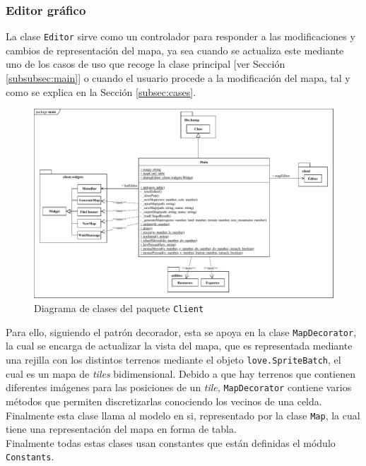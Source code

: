 \subsubsection{Editor gráfico}
\label{subsubsec:client}

La clase \texttt{Editor} sirve como un controlador para responder a las modificaciones y cambios de representación del mapa, ya sea cuando se actualiza este mediante uno de los casos de uso que recoge la clase principal [ver Sección \ref{subsubsec:main}] o cuando el usuario procede a la modificación del mapa, tal y como se explica en la Sección \ref{subsec:cases}.

\begin{figure}[!h]
	\centering
	\includegraphics[width=\textwidth]{images/clase-editor.pdf}
	\caption{Diagrama de clases del paquete \texttt{Client}}
	\label{fig:editorclass}
\end{figure}

Para ello, siguiendo el patrón decorador, esta se apoya en la clase \texttt{MapDecorator}, la cual se encarga de actualizar la vista del mapa, que es representada mediante una rejilla con los distintos terrenos mediante el objeto \texttt{love.SpriteBatch}, el cual es un mapa de \textit{tiles} bidimensional. Debido a que hay terrenos que contienen diferentes imágenes para las posiciones de un \textit{tile}, \texttt{MapDecorator} contiene varios métodos que permiten discretizarlas conociendo los vecinos de una celda. Finalmente esta clase llama al modelo en si, representado por la clase \texttt{Map}, la cual tiene una representación del mapa en forma de tabla. \\

Finalmente todas estas clases usan constantes que están definidas el módulo \texttt{Constants}.

